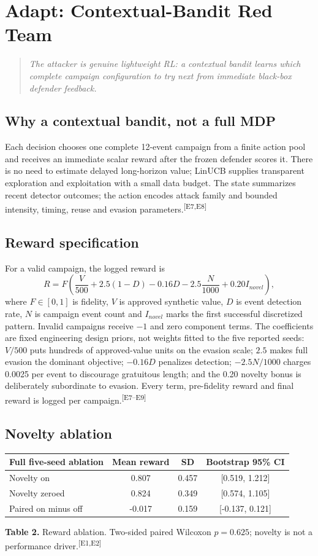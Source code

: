 \documentclass[11pt,a4paper,oneside]{article}
\newcommand{\evidence}[1]{\textsuperscript{\textcolor{EvidenceGray}{[#1]}}}
\newcommand{\fixedtablecaption}[3]{%
  \par\smallskip\phantomsection\hypertarget{#1}{}\label{#1}\begin{minipage}{\linewidth}\small\textbf{Table #2.} #3\end{minipage}\par\smallskip}
\newcommand{\sectionlead}[1]{\begin{quote}\itshape #1\end{quote}}
\begin{document}
\section{Adapt: Contextual-Bandit Red Team}
\sectionlead{The attacker is genuine lightweight RL: a contextual bandit learns which complete campaign configuration to try next from immediate black-box defender feedback.}

\subsection{Why a contextual bandit, not a full MDP}
Each decision chooses one complete 12-event campaign from a finite action pool and receives an immediate scalar reward after the frozen defender scores it. There is no need to estimate delayed long-horizon value; LinUCB supplies transparent exploration and exploitation with a small data budget. The state summarizes recent detector outcomes; the action encodes attack family and bounded intensity, timing, reuse and evasion parameters.\evidence{E7,E8}

\subsection{Reward specification}
For a valid campaign, the logged reward is
\begin{equation}
R = F\left(\frac{V}{500}+2.5(1-D)-0.16D-2.5\frac{N}{1000}+0.20I_{novel}\right),
\label{eq:reward}
\end{equation}
where $F\in[0,1]$ is fidelity, $V$ is approved synthetic value, $D$ is event detection rate, $N$ is campaign event count and $I_{novel}$ marks the first successful discretized pattern. Invalid campaigns receive $-1$ and zero component terms. The coefficients are fixed engineering design priors, not weights fitted to the five reported seeds: $V/500$ puts hundreds of approved-value units on the evasion scale; $2.5$ makes full evasion the dominant objective; $-0.16D$ penalizes detection; $-2.5N/1000$ charges 0.0025 per event to discourage gratuitous length; and the 0.20 novelty bonus is deliberately subordinate to evasion. Every term, pre-fidelity reward and final reward is logged per campaign.\evidence{E7--E9}

\subsection{Novelty ablation}
\begin{table}[H]
\centering\small
\begin{tabular}{lccc}
\toprule
\textbf{Full five-seed ablation} & \textbf{Mean reward} & \textbf{SD} & \textbf{Bootstrap 95\% CI} \\
\midrule
Novelty on & 0.807 & 0.457 & [0.519, 1.212] \\
Novelty zeroed & 0.824 & 0.349 & [0.574, 1.105] \\
Paired on minus off & -0.017 & 0.159 & [-0.137, 0.121] \\
\bottomrule
\end{tabular}
\fixedtablecaption{tab:ablation}{2}{Reward ablation. Two-sided paired Wilcoxon $p=0.625$; novelty is not a performance driver.\evidence{E1,E2}}
\end{table}
\end{document}
